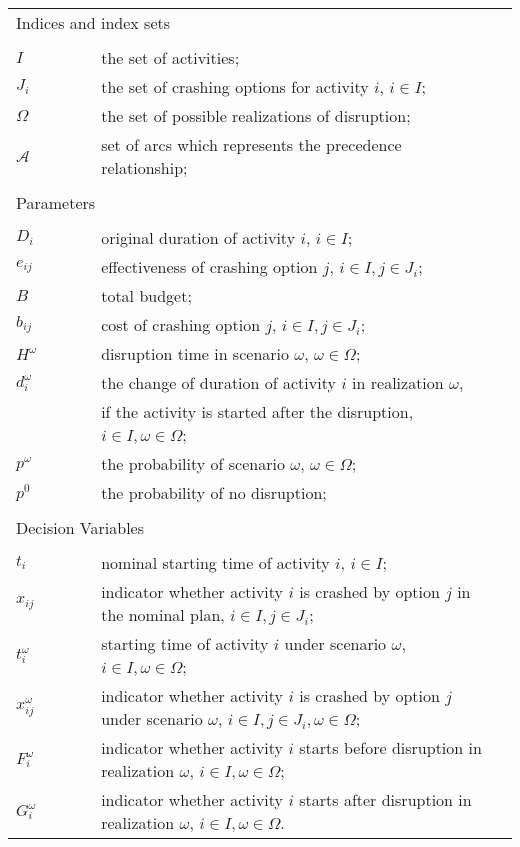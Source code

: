 \documentclass[11pt]{article}
\begin{document}
	\begin{table}[H]
		\begin{tabular}{ l l l l }
			\multicolumn{4}{l}{Indices and index sets} \\
			\\
			\(I\) & \(\qquad\) & the set of activities;&\\
			\(J_i\) & \(\qquad\) & the set of crashing options for activity \(i\), \(i \in I\);&\\
			\(\Omega\) & \(\qquad\) & the set of possible realizations of disruption;&\\
			\(\mathcal{A}\) &\(\qquad\) & set of arcs which represents the precedence relationship;&\\
			\\
			\multicolumn{4}{l}{Parameters} \\
			\\
			\(D_{i}\)& \(\qquad\) & original duration of activity \(i\), \(i \in I\);&\\
			\(e_{ij}\) & \(\qquad\) & effectiveness of crashing option \(j\), \(i \in I, j \in J_i\);&\\
			\(B\) & \(\qquad\) & total budget;&\\
			\(b_{ij}\) & \(\qquad\) & cost of crashing option \(j\), \(i \in I, j \in J_i\);&\\
			\(H^\omega\) &\(\qquad\) & disruption time in scenario \(\omega\), \(\omega \in \Omega\);&\\
			\(d_{i}^\omega\) & \(\qquad\)&the change of duration of activity \(i\) in realization \(\omega\), &\\
			& \(\qquad\) & if the activity is started after the disruption, \(i \in I, \omega \in \Omega\);& \\
			\(p^\omega\) & \(\qquad\) & the probability of scenario \(\omega\), \(\omega \in \Omega\);& \\
			\(p^0\) & \(\qquad\) & the probability of no disruption;& \\
			\\
			\multicolumn{4}{l}{Decision Variables}\\
			\\
			\(t_{i}\) & \(\qquad\) & nominal starting time of activity \(i\), \(i \in I\);&\\
			\(x_{ij}\) & \(\qquad\) & indicator whether activity \(i\) is crashed by option \(j\) in the nominal plan, \(i \in I, j \in J_i\); &\\
			\(t_{i}^\omega\) & \(\qquad\) & starting time of activity \(i\) under scenario \(\omega\), \(i \in I, \omega \in \Omega\);&\\
			\(x_{ij}^\omega\) & \(\qquad\) & indicator whether activity \(i\) is crashed by option \(j\) under scenario \(\omega\), \(i \in I, j \in J_i, \omega \in \Omega \); &\\
			\(F_i^\omega\) & \(\qquad\) & indicator whether activity \(i\) starts before disruption in realization \(\omega\), \(i \in I, \omega \in \Omega\);&\\
			\(G_i^\omega\) & \(\qquad\) & indicator whether activity \(i\) starts after disruption in realization \(\omega\), \(i \in I, \omega \in \Omega\).&\\
		\end{tabular}
	\end{table}
\end{document}
